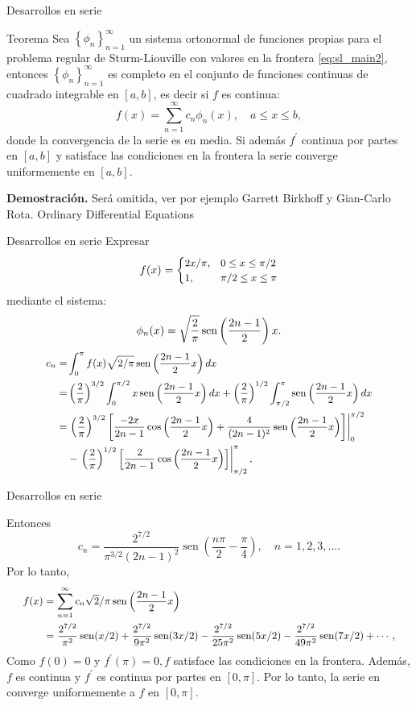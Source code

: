  {Desarrollos en serie}
 
 \begin{block}{Teorema}  Sea $\left\{\phi_{n}\right\}_{n=1}^{\infty}$ un sistema ortonormal de funciones propias para el problema regular de Sturm-Liouville con valores en la frontera \eqref{eq:sl_main2}, entonces $\left\{\phi_{n}\right\}_{n=1}^{\infty}$ es completo en el conjunto de funciones continuas de cuadrado integrable en $[a,b]$, es decir si $f$ es continua:
  $$f(x)=\sum_{n=1}^{\infty} c_{n} \phi_{n}(x), \quad a \leq x \leq b,$$
  donde la convergencia de la serie es en media. Si además $f^{\prime}$ continua por partes  en $[a, b]$ y satisface las condiciones en la frontera la serie converge uniformemente en $[a, b]$.
 \end{block}
 
 
 \textbf{Demostración.}  Será omitida, ver por ejemplo Garrett Birkhoff y Gian-Carlo Rota. Ordinary Differential Equations
 

 {Desarrollos en serie}
Expresar
$$\small
f(x)= \begin{cases}2 x / \pi, & 0 \leq x \leq \pi / 2 \\ 1, & \pi / 2 \leq x \leq \pi\end{cases}
$$
mediante  el sistema:
$$\small
\phi_{n}(x)=\sqrt{\frac{2}{\pi}}\operatorname{sen}\left(\frac{2 n-1}{2}\right) x. $$ 
$$\small
\begin{aligned}
c_{n}=& \int_{0}^{\pi} f(x) \sqrt{2 / \pi} \operatorname{sen}\left(\frac{2 n-1}{2} x\right) d x \\
=&\left(\frac{2}{\pi}\right)^{3 / 2} \int_{0}^{\pi / 2} x \operatorname{sen}\left(\frac{2 n-1}{2} x\right) d x+\left(\frac{2}{\pi}\right)^{1 / 2} \int_{\pi / 2}^{\pi} \operatorname{sen}\left(\frac{2 n-1}{2} x\right) d x \\
=&\left.\left(\frac{2}{\pi}\right)^{3 / 2}\left[\frac{-2 x}{2 n-1} \cos \left(\frac{2 n-1}{2} x\right)+\frac{4}{(2 n-1)^{2}} \operatorname{sen}\left(\frac{2 n-1}{2} x\right)\right]\right|_{0} ^{\pi / 2} \\
&-\left.\left(\frac{2}{\pi}\right)^{1 / 2}\left[\frac{2}{2 n-1} \cos \left(\frac{2 n-1}{2} x\right)\right]\right|_{\pi / 2} ^{\pi},
\end{aligned}
$$
 

 {Desarrollos en serie}
 
 Entonces 
$$c_{n}=\frac{2^{7 / 2}}{\pi^{3 / 2}(2 n-1)^{2}} \operatorname{sen}\left(\frac{n \pi}{2}-\frac{\pi}{4}\right),\quad n=1,2,3, \ldots .$$
Por lo tanto,
$$\small
\begin{aligned}
f(x) &=\sum_{n=1}^{\infty} c_{n} \sqrt{2} / \pi \operatorname{sen}\left(\frac{2 n-1}{2} x\right) \\
&=\frac{2^{7 / 2}}{\pi^{2}} \operatorname{sen}(x / 2)+\frac{2^{7 / 2}}{9 \pi^{2}} \operatorname{sen}(3 x / 2)-\frac{2^{7 / 2}}{25 \pi^{2}} \operatorname{sen}(5 x / 2)-\frac{2^{7 / 2}}{49 \pi^{2}} \operatorname{sen}(7 x / 2)+\cdots,
\end{aligned}
$$
 Como $f(0)=0$ y $f^{\prime}(\pi)=0, f$ satisface las condiciones en la frontera. Además, $f$ es continua y $f^{\prime}$ es continua por partes en $[0, \pi]$. Por lo tanto, la serie en converge uniformemente a $f$ en $[0, \pi]$.



